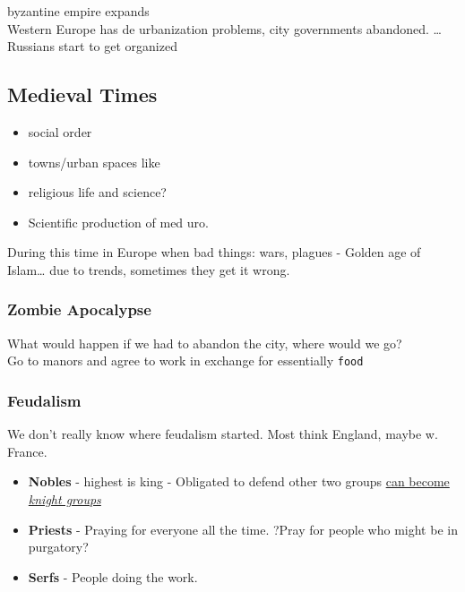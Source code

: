 \documentclass[11pt]{article}
\begin{document}
byzantine empire expands\\
Western Europe has de urbanization problems, city governments abandoned.
\ldots{} Russians start to get organized

\subsection{Medieval Times}
\label{sec-7-4}
\begin{itemize}
\item social order\\
\item towns/urban spaces like\\
\item religious life and science?\\
\item Scientific production of med uro.
\end{itemize}

During this time in Europe when bad things: wars, plagues - Golden age of Islam\ldots{}
due to trends, sometimes they get it wrong.\\
\subsubsection{Zombie Apocalypse}
\label{sec-7-4-1}
What would happen if we had to abandon the city, where would we go? \\
Go to manors and agree to work in exchange for essentially \texttt{food}

\subsubsection{Feudalism}
\label{sec-7-4-2}
We don't really know where feudalism started. Most think England, maybe w. France.
\begin{itemize}
\item \textbf{Nobles} - highest is king - Obligated to defend other two groups \uline{can become \emph{knight groups}} \\
\item \textbf{Priests} - Praying for everyone all the time. ?Pray for people who might be in purgatory?
\item \textbf{Serfs} - People doing the work.
\end{itemize}
\end{document}
